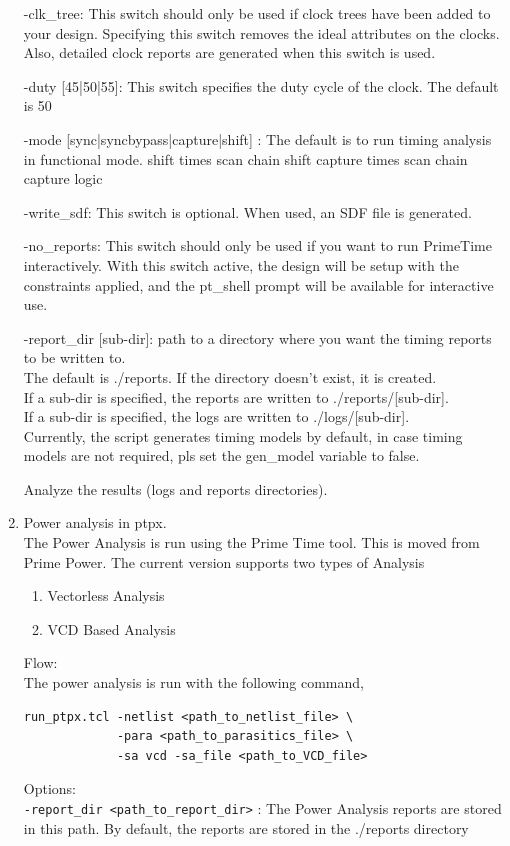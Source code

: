 \documentclass[a4paper,12pt,twoside]{article}
\begin{document}
\begin{enumerate}
      -clk\_tree: This switch should only be used if clock trees have been added to your design. Specifying this switch removes the ideal attributes on the clocks. Also, detailed clock reports are generated when this switch is used.
    
      -duty [45|50|55]: This switch specifies the duty cycle of the clock. The default is 50%
    
      -mode [sync|syncbypass|capture|shift] : The default is to run timing analysis in functional mode. shift times scan chain shift capture times scan chain capture logic
    
      -write\_sdf: This switch is optional. When used, an SDF file is generated.
     
      -no\_reports: This switch should only be used if you want to run PrimeTime interactively. With this switch active, the design will be setup with the constraints applied, and the pt\_shell prompt will be available for interactive use.
    
      -report\_dir [sub-dir]: path to a directory where you want the timing reports to be written to.\\
         The default is ./reports. If the directory doesn't exist, it is created.\\
         If a sub-dir is specified, the reports are written to ./reports/[sub-dir].\\
         If a sub-dir is specified, the logs are written to ./logs/[sub-dir].\\
    Currently, the script generates timing models by default, in case timing models are not required, pls set the gen\_model variable to false.
    
    Analyze the results (logs and reports directories).
    \item Power analysis in ptpx.\\
    The Power Analysis is run using the Prime Time tool. This is moved from Prime Power. The current version supports two types of Analysis
    \begin{enumerate}
        \item Vectorless Analysis
        \item VCD Based Analysis
    \end{enumerate}
    Flow:\\
    The power analysis is run with the following command,
    \begin{verbatim}
run_ptpx.tcl -netlist <path_to_netlist_file> \
             -para <path_to_parasitics_file> \
             -sa vcd -sa_file <path_to_VCD_file>
    \end{verbatim}
    Options:\\
    \texttt{-report\_dir <path\_to\_report\_dir>} : The Power Analysis reports are stored in this path. By default, the reports are stored in the ./reports directory


\end{enumerate}
\end{document}
